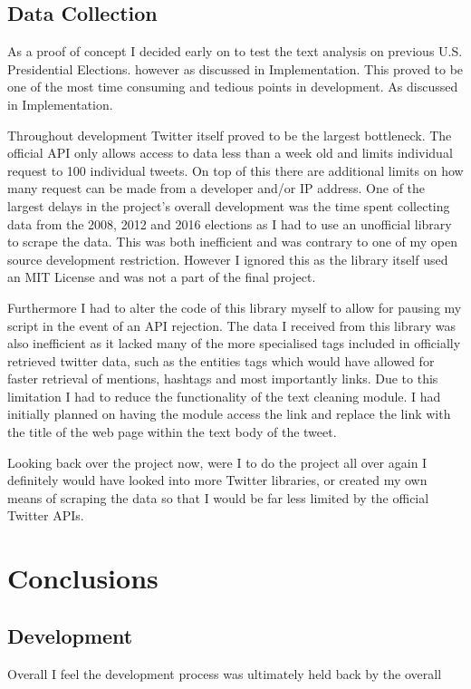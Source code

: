 \documentclass[12pt,a4paper]{report}
\begin{document}
  \section{Data Collection}
  As a proof of concept I decided early on to test the text analysis on previous U.S. Presidential Elections. however as discussed in Implementation. This proved to be one of the most time consuming and tedious points in development. As discussed in Implementation.
  \par
  Throughout development Twitter itself proved to be the largest bottleneck. The official API only allows access to data less than a week old and limits individual request to 100 individual tweets. On top of this there are additional limits on how many request can be made from a developer and/or IP address\cite{TwitterAPILimits}. One of the largest delays in the project’s overall development was the time spent collecting data from the 2008, 2012 and 2016 elections as I had to use an unofficial library to scrape the data. This was both inefficient and was contrary to one of my open source development restriction. However I ignored this as the library itself used an MIT License\cite{MITLicense} and was not a part of the final project. 
  \par
  Furthermore I had to alter the code of this library myself to allow for pausing my script in the event of an API rejection. The data I received from this library was also inefficient as it lacked many of the more specialised tags included in officially retrieved twitter data, such as the entities tags which would have allowed for faster retrieval of mentions, hashtags and most importantly links. Due to this limitation I had to reduce the functionality of the text cleaning module. I had initially planned on having the module access the link and replace the link with the title of the web page within the text body of the tweet.
  \par
  Looking back over the project now, were I to do the project all over again I definitely would have looked into more Twitter libraries, or created my own means of scraping the data so that I would be far less limited by the official Twitter APIs.

\chapter{Conclusions}
  \section{Development}
  Overall I feel the development process was ultimately held back by the overall
\end{document}
